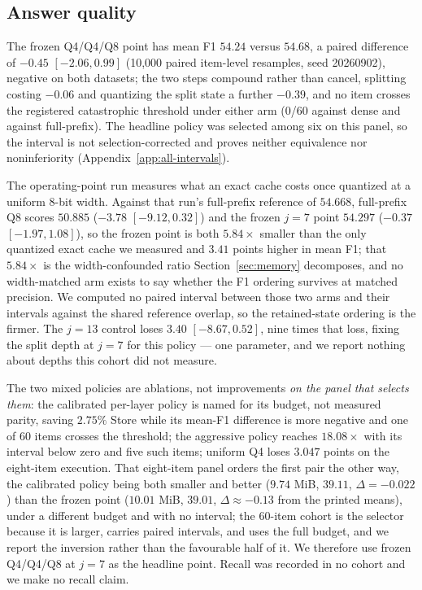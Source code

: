 \documentclass{article}
\begin{document}
\subsection{Answer quality}
\label{sec:quality}

The frozen Q4/Q4/Q8 point has mean F1 $54.24$ versus $54.68$, a paired difference of
$-0.45$ $[-2.06,0.99]$ (10,000 paired item-level resamples, seed 20260902),
negative on both datasets; the two steps compound rather than cancel, splitting
costing $-0.06$ and quantizing the split state a further $-0.39$, and no item
crosses the registered catastrophic threshold under either arm (0/60 against
dense and against full-prefix).  The headline policy was selected among six on
this panel, so the interval is not selection-corrected and proves neither
equivalence nor noninferiority (Appendix~\ref{app:all-intervals}).

The operating-point run measures what an exact cache costs once quantized at a
uniform 8-bit width.  Against that run's full-prefix reference of $54.668$,
full-prefix Q8 scores $50.885$ ($-3.78$ $[-9.12,0.32]$) and the frozen $j=7$
point $54.297$ ($-0.37$ $[-1.97,1.08]$), so the frozen point is both
$5.84\times$ smaller than the only quantized exact cache we measured and $3.41$
points higher in mean F1; that $5.84\times$ is the width-confounded ratio
Section~\ref{sec:memory} decomposes, and no width-matched arm exists to say
whether the F1 ordering survives at matched precision.  We computed no paired
interval between those two arms and their intervals against the shared reference
overlap, so the retained-state ordering is the firmer.  The $j=13$ control loses
$3.40$ $[-8.67,0.52]$, nine times that loss, fixing the split depth at $j=7$ for
this policy --- one parameter, and we report nothing about depths this cohort did
not measure.

The two mixed policies are ablations, not improvements \emph{on the panel that
selects them}: the calibrated per-layer policy is named for its budget, not
measured parity, saving $2.75\%$ Store while its mean-F1 difference is more
negative and one of 60 items crosses the threshold; the aggressive policy
reaches $18.08\times$ with its interval below zero and five such items; uniform
Q4 loses $3.047$ points on the eight-item execution.  That eight-item
panel orders the first pair the other way, the calibrated policy being both
smaller and better ($9.74$ MiB, $39.11$, $\Delta=-0.022$) than the frozen point
($10.01$ MiB, $39.01$, $\Delta\approx-0.13$ from the printed means), under a
different budget and with no interval; the 60-item cohort is the selector
because it is larger, carries paired intervals, and uses the full budget, and we
report the inversion rather than the favourable half of it.  We therefore use
frozen Q4/Q4/Q8 at $j=7$ as the headline point.  Recall was recorded in no
cohort and we make no recall claim.
\end{document}
